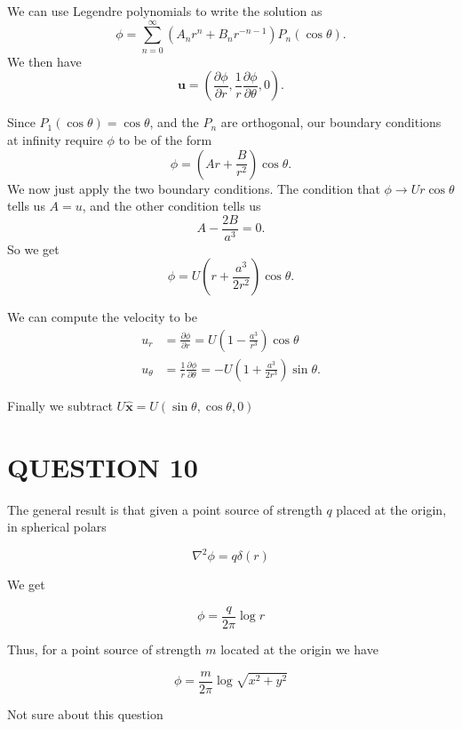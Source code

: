\documentclass[a4paper]{article}
\begin{document}
We can use Legendre polynomials to write the solution as
\[
\phi = \sum_{n = 0}^\infty (A_n r^n + B_n r^{-n - 1})P_n(\cos \theta).
\]
We then have
\[
\mathbf{u} =
\left(\frac{\partial \phi}{\partial r}, \frac{1}{r}\frac{\partial \phi}{\partial \theta},0\right).
\]

Since $P_1(\cos \theta) = \cos \theta$, and the $P_n$ are orthogonal, our boundary conditions at infinity require $\phi$ to be of the form
\[
\phi = \left(Ar + \frac{B}{r^2}\right) \cos \theta.
\]
We now just apply the two boundary conditions. The condition that $\phi \to Ur \cos \theta$ tells us $A = u$, and the other condition tells us
\[
A - \frac{2B}{a^3} = 0.
\]
So we get
\[
\phi = U\left(r + \frac{a^3}{2r^2}\right) \cos \theta.
\]

We can compute the velocity to be
\begin{align*}
u_r &= \frac{\partial \phi}{\partial r} = U\left(1 - \frac{a^3}{r^3}\right) \cos \theta\\
u_\theta &= \frac{1}{r} \frac{\partial \phi}{\partial \theta} = -U\left(1 + \frac{a^3}{2r^3}\right)\sin \theta.
\end{align*}

Finally we subtract $  U \hat{\mathbf{x}} = U( \sin \theta, \cos \theta, 0) $


\section{QUESTION 10}


The general result is that given a point source of strength $ q $ placed at the origin, in spherical polars

\[ \nabla^{2} \phi = q \delta(r)  \]

We get

\[ \phi = \frac{q}{2 \pi} \log r \]

Thus, for a point source of strength $ m $ located at the origin we have

\[ \phi = \frac{m}{2 \pi} \log \sqrt{x^{2} + y^{2}} \]

Not sure about this question
\end{document}
